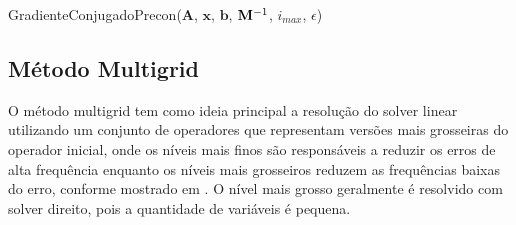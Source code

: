 \vspace{1cm}
\begin{algorithm}[H]
\caption{GradienteConjugadoPrecon($\mathbf{A}$, $\mathbf{x}$, $\mathbf{b}$, $\mathbf{M}^{-1}$, $i_{max}$, $\epsilon$)}
\label{alg:algoritmocgprecon}
\end{algorithm}
\vspace{1cm}


\subsection{Método Multigrid}

O método multigrid tem como ideia principal a resolução do solver linear utilizando um conjunto de operadores que representam versões mais grosseiras do operador inicial, onde os níveis mais finos são responsáveis a reduzir os erros de alta frequência enquanto os níveis mais grosseiros reduzem as frequências baixas do erro, conforme mostrado em \citet{multigridtutorial}. O nível mais grosso geralmente é resolvido com solver direito, pois a quantidade de variáveis é pequena. 

